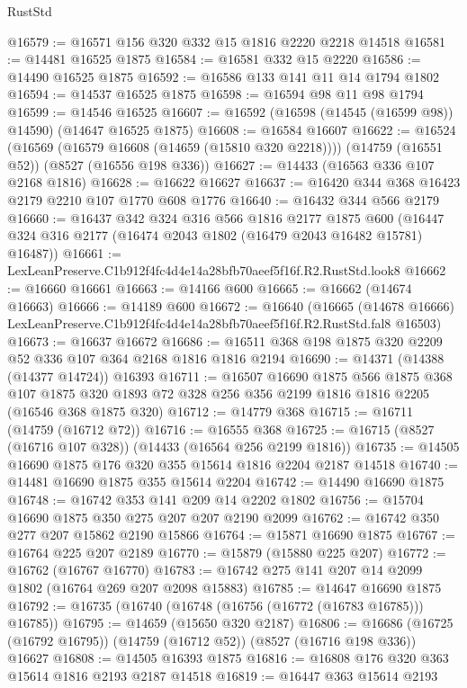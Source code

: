 \begin{lexlean}{RustStd}
\begin{coremodule}
@16579 := @16571 @156 @320 @332 @15 @1816 @2220 @2218 @14518
@16581 := @14481 @16525 @1875
@16584 := @16581 @332 @15 @2220
@16586 := @14490 @16525 @1875
@16592 := @16586 @133 @141 @11 @14 @1794 @1802
@16594 := @14537 @16525 @1875
@16598 := @16594 @98 @11 @98 @1794
@16599 := @14546 @16525
@16607 := @16592 (@16598 (@14545 (@16599 @98)) @14590) (@14647 @16525 @1875)
@16608 := @16584 @16607
@16622 := @16524
    (@16569 (@16579 @16608 (@14659 (@15810 @320 @2218))))
    (@14759 (@16551 @52))
    (@8527 (@16556 @198 @336))
@16627 := @14433 (@16563 @336 @107 @2168 @1816)
@16628 := @16622 @16627
@16637 := @16420 @344 @368 @16423 @2179 @2210 @107 @1770 @608 @1776
@16640 := @16432 @344 @566 @2179
@16660 := @16437
    @342
    @324
    @316
    @566
    @1816
    @2177
    @1875
    @600
    (@16447 @324 @316 @2177 (@16474 @2043 @1802 (@16479 @2043 @16482 @15781) @16487))
@16661 := LexLeanPreserve.C1b912f4fc4d4e14a28bfb70aeef5f16f.R2.RustStd.look8
@16662 := @16660 @16661
@16663 := @14166 @600
@16665 := @16662 (@14674 @16663)
@16666 := @14189 @600
@16672 := @16640
    (@16665
      (@14678 @16666)
      LexLeanPreserve.C1b912f4fc4d4e14a28bfb70aeef5f16f.R2.RustStd.fal8
      @16503)
@16673 := @16637 @16672
@16686 := @16511 @368 @198 @1875 @320 @2209 @52 @336 @107 @364 @2168 @1816 @1816 @2194
@16690 := @14371 (@14388 (@14377 @14724)) @16393
@16711 := @16507
    @16690
    @1875
    @566
    @1875
    @368
    @107
    @1875
    @320
    @1893
    @72
    @328
    @256
    @356
    @2199
    @1816
    @1816
    @2205
    (@16546 @368 @1875 @320)
@16712 := @14779 @368
@16715 := @16711 (@14759 (@16712 @72))
@16716 := @16555 @368
@16725 := @16715 (@8527 (@16716 @107 @328)) (@14433 (@16564 @256 @2199 @1816))
@16735 := @14505 @16690 @1875 @176 @320 @355 @15614 @1816 @2204 @2187 @14518
@16740 := @14481 @16690 @1875 @355 @15614 @2204
@16742 := @14490 @16690 @1875
@16748 := @16742 @353 @141 @209 @14 @2202 @1802
@16756 := @15704 @16690 @1875 @350 @275 @207 @207 @2190 @2099
@16762 := @16742 @350 @277 @207 @15862 @2190 @15866
@16764 := @15871 @16690 @1875
@16767 := @16764 @225 @207 @2189
@16770 := @15879 (@15880 @225 @207)
@16772 := @16762 (@16767 @16770)
@16783 := @16742 @275 @141 @207 @14 @2099 @1802 (@16764 @269 @207 @2098 @15883)
@16785 := @14647 @16690 @1875
@16792 := @16735 (@16740 (@16748 (@16756 (@16772 (@16783 @16785))) @16785))
@16795 := @14659 (@15650 @320 @2187)
@16806 := @16686 (@16725 (@16792 @16795)) (@14759 (@16712 @52)) (@8527 (@16716 @198 @336)) @16627
@16808 := @14505 @16393 @1875
@16816 := @16808 @176 @320 @363 @15614 @1816 @2193 @2187 @14518
@16819 := @16447 @363 @15614 @2193

\end{coremodule}
\end{lexlean}
